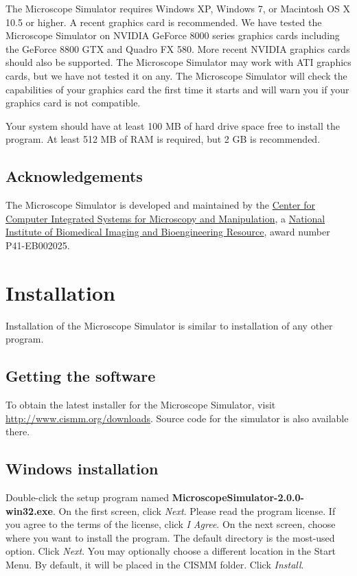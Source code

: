 \documentclass[11pt,titlepage]{article}
\begin{document}
The Microscope Simulator requires Windows XP, Windows 7, or Macintosh OS X 10.5 or higher. A recent graphics card is recommended. We have tested the Microscope Simulator on NVIDIA GeForce 8000 series graphics cards including the GeForce 8800 GTX and Quadro FX 580. More recent NVIDIA graphics cards should also be supported. The Microscope Simulator may work with ATI graphics cards, but we have not tested it on any. The Microscope Simulator will check the capabilities of your graphics card the first time it starts and will warn you if your graphics card is not compatible.

Your system should have at least 100 MB of hard drive space free to install the program. At least 512 MB of RAM is required, but 2 GB is recommended.

\subsection{Acknowledgements}

The Microscope Simulator is developed and maintained by the \href{http://www.cismm.org}{Center for Computer Integrated Systems for Microscopy and Manipulation}, a \href{http://www.nibib.nih.gov/}{National Institute of Biomedical Imaging and Bioengineering Resource}, award number P41-EB002025.

\section{Installation}

Installation of the Microscope Simulator is similar to installation of any other program.

\subsection{Getting the software}

To obtain the latest installer for the Microscope Simulator, visit \url{http://www.cismm.org/downloads}. Source code for the simulator is also available there.

\subsection{Windows installation}

Double-click the setup program named \textbf{MicroscopeSimulator-2.0.0-win32.exe}. On the first screen, click \emph{Next}. Please read the program license. If you agree to the terms of the license, click \emph{I Agree}. On the next screen, choose where you want to install the program. The default directory is the most-used option. Click \emph{Next}. You may optionally choose a different location in the Start Menu. By default, it will be placed in the CISMM folder. Click \emph{Install}.
\end{document}
